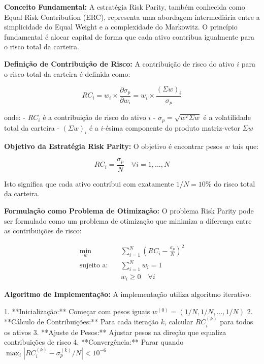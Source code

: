 \textbf{Conceito Fundamental:} A estratégia Risk Parity, também conhecida como Equal Risk Contribution (ERC), representa uma abordagem intermediária entre a simplicidade do Equal Weight e a complexidade do Markowitz. O princípio fundamental é alocar capital de forma que cada ativo contribua igualmente para o risco total da carteira.

\textbf{Definição de Contribuição de Risco:} A contribuição de risco do ativo $i$ para o risco total da carteira é definida como:

\begin{equation}
RC_i = w_i \times \frac{\partial \sigma_p}{\partial w_i} = w_i \times \frac{(\Sigma w)_i}{\sigma_p}
\end{equation}

onde:
- $RC_i$ é a contribuição de risco do ativo $i$
- $\sigma_p = \sqrt{w^T \Sigma w}$ é a volatilidade total da carteira
- $(\Sigma w)_i$ é a $i$-ésima componente do produto matriz-vetor $\Sigma w$

\textbf{Objetivo da Estratégia Risk Parity:} O objetivo é encontrar pesos $w$ tais que:

\begin{equation}
RC_i = \frac{\sigma_p}{N} \quad \forall i = 1, ..., N
\end{equation}

Isto significa que cada ativo contribui com exatamente $1/N = 10\%$ do risco total da carteira.

\textbf{Formulação como Problema de Otimização:} O problema Risk Parity pode ser formulado como um problema de otimização que minimiza a diferença entre as contribuições de risco:

\begin{align}
\min_{w} \quad & \sum_{i=1}^{N} \left(RC_i - \frac{\sigma_p}{N}\right)^2 \\
\text{sujeito a:} \quad & \sum_{i=1}^{N} w_i = 1 \\
& w_i \geq 0 \quad \forall i
\end{align}

\textbf{Algoritmo de Implementação:} A implementação utiliza algoritmo iterativo:

1. **Inicialização:** Começar com pesos iguais $w^{(0)} = (1/N, 1/N, ..., 1/N)$
2. **Cálculo de Contribuições:** Para cada iteração $k$, calcular $RC_i^{(k)}$ para todos os ativos
3. **Ajuste de Pesos:** Ajustar pesos na direção que equaliza contribuições de risco
4. **Convergência:** Parar quando $\max_i |RC_i^{(k)} - \sigma_p^{(k)}/N| < 10^{-6}$

